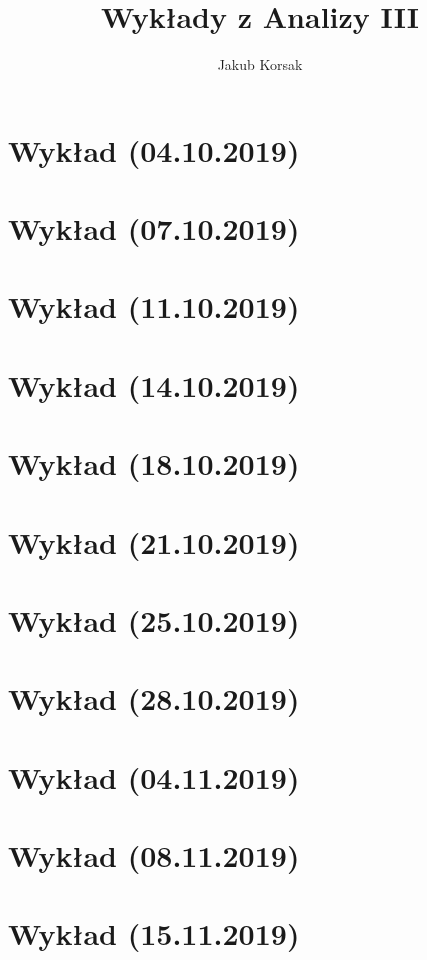 \documentclass[a5]{article}
\title{Wykłady z Analizy III}
\author{Jakub Korsak}
\date{}
\begin{document}
\maketitle

\pagebreak
\section{Wykład (04.10.2019)}

\pagebreak
\section{Wykład (07.10.2019)}

\pagebreak
\section{Wykład (11.10.2019)}

\pagebreak
\section{Wykład (14.10.2019)}

\pagebreak
\section{Wykład (18.10.2019)}

\pagebreak
\section{Wykład (21.10.2019)}

\pagebreak
\section{Wykład (25.10.2019)}

\pagebreak
\section{Wykład (28.10.2019)}

\pagebreak
\section{Wykład (04.11.2019)}

\pagebreak
\section{Wykład (08.11.2019)}

\pagebreak
\section{Wykład (15.11.2019)}

\pagebreak
\end{document}
